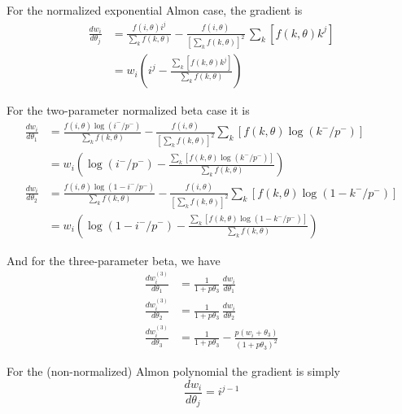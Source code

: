 \documentclass{article}
\begin{document}
For the normalized exponential Almon case, the gradient is
\begin{align*}
\frac{dw_i}{d\theta_j} &= 
\frac{f(i, \theta) i^j}{\sum_kf(k, \theta)} - 
\frac{f(i, \theta)}{\left[\sum_kf(k, \theta)\right]^2}
\, \sum_k\left[f(k, \theta) k^j\right] \\[4pt]
 &= w_i \left(i^j - 
\frac{\sum_k\left[f(k,\theta)k^j\right]}{\sum_k f(k, \theta)}\right)
\end{align*}

For the two-parameter normalized beta case it is
\begin{align*}
\frac{dw_i}{d\theta_1} &=
\frac{f(i,\theta) \log(i^-/p^-)}{\sum_k f(k, \theta)} -
\frac{f(i,\theta)}{\left[\sum_k f(k,\theta)\right]^2}
\sum_k\left[f(k,\theta) \log(k^-/p^-)\right] \\[4pt]
&= w_i \left(\log(i^-/p^-) - 
\frac{\sum_k\left[f(k,\theta) \log(k^-/p^-)\right]}{\sum_k 
 f(k,\theta)}\right) \\[8pt]
\frac{dw_i}{d\theta_2} &=
\frac{f(i,\theta) \log(1 - i^-/p^-)}{\sum_k f(k, \theta)} -
\frac{f(i,\theta)}{\left[\sum_k f(k,\theta)\right]^2}
\sum_k\left[f(k,\theta) \log(1 - k^-/p^-)\right] \\[4pt]
&= w_i \left(\log(1 - i^-/p^-) - 
\frac{\sum_k\left[f(k,\theta) \log(1 - k^-/p^-)\right]}{\sum_k 
 f(k,\theta)}\right)
\end{align*}

And for the three-parameter beta, we have
\begin{align*}
\frac{dw^{(3)}_i}{d\theta_1} &= 
  \frac{1}{1+p\theta_3} \, \frac{dw_i}{d\theta_1} \\
\frac{dw^{(3)}_i}{d\theta_2} &= 
  \frac{1}{1+p\theta_3} \, \frac{dw_i}{d\theta_2} \\
\frac{dw^{(3)}_i}{d\theta_3} &=
\frac{1}{1+p\theta_3} - \frac{p(w_i + \theta_3)}{(1+p\theta_3)^2}
\end{align*}

For the (non-normalized) Almon polynomial the gradient is simply
\[
\frac{dw_i}{d\theta_j} = i^{j-1}
\]
\end{document}
